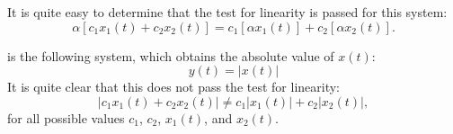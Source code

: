 It is quite easy to determine that the test for linearity is passed for this system:
\begin{equation}
   \alpha [c_1 x_1(t) + c_2 x_2(t)] = c_1 [\alpha x_1(t)] + c_2 [\alpha x_2(t)].
\end{equation}

 is the following system, 
which obtains the absolute value of $x(t)$:
\begin{equation}
   y(t) = |x(t)|
\end{equation}
It is quite clear that this does not pass the test for linearity:
\begin{equation}
   |c_1 x_1(t) + c_2 x_2(t)| \ne c_1 |x_1(t)| + c_2 |x_2(t)|,
\end{equation}
for all possible values $c_1$, $c_2$, $x_1(t)$, and $x_2(t)$.
